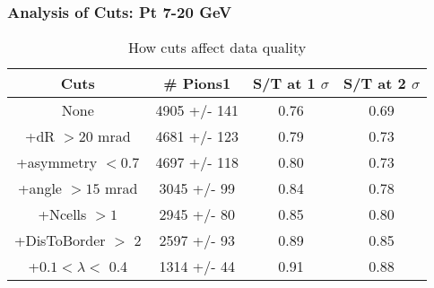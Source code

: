 \frame
{
\frametitle{Analysis of Cuts: Pt 7-20 GeV}
\begin{table}
\caption{How cuts affect data quality}
\centering
\begin{tabular}{c c c c}
\hline\hline
Cuts & \# Pions1 & S/T at 1 $\sigma$ & S/T at 2 $\sigma$ \\ [0.5ex]
\hline
None & 4905 +/-  141 & 0.76 & 0.69 \\ %
+dR $> 20$ mrad & 4681 +/-  123 & 0.79 & 0.73 \\ %
+asymmetry $< 0.7$ & 4697 +/-  118 & 0.80 & 0.73 \\ %
+angle $> 15$ mrad & 3045 +/-   99 & 0.84 & 0.78 \\ %
+Ncells $> 1$& 2945 +/-   80 & 0.85 & 0.80 \\ %
+DisToBorder $>$ 2 & 2597 +/-   93 & 0.89 & 0.85 \\ %
+$0.1 < \lambda <$ 0.4 & 1314 +/-   44 & 0.91 & 0.88 \\ %
[1ex]
\hline
\end{tabular}
\label{table:nonlin}
\end{table}
}
